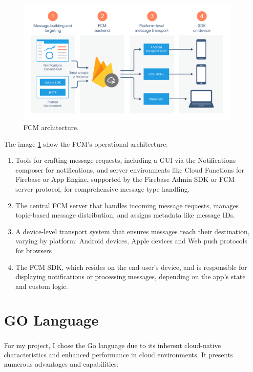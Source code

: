 \begin{figure}
    \centering
    \includegraphics[scale=0.2]{Pictures/3_firebase.png}
    \caption{FCM architecture.}
    \label{fig:3_firebase}
\end{figure}

The image \ref{fig:3_firebase} show the FCM's operational architecture:

\begin{enumerate}
    \item Tools for crafting message requests, including a GUI via the Notifications composer for
          notifications, and server environments like Cloud Functions for Firebase or App Engine,
          supported by the Firebase Admin SDK or FCM server protocol, for comprehensive message type
          handling.
    \item The central FCM server that handles incoming message requests, manages topic-based message
          distribution, and assigns metadata like message IDs.
    \item A device-level transport system that ensures messages reach their destination, varying by
          platform: Android devices, Apple devices and Web push protocols for browsers
    \item The FCM SDK, which resides on the end-user's device, and is responsible for displaying
          notifications or processing messages, depending on the app's state and custom logic.
\end{enumerate}

\section{GO Language}
For my project, I chose the Go language\textsuperscript{\cite{tech_10}} due to its inherent
cloud-native characteristics and enhanced performance in cloud environments. It presents numerous
advantages and capabilities:

